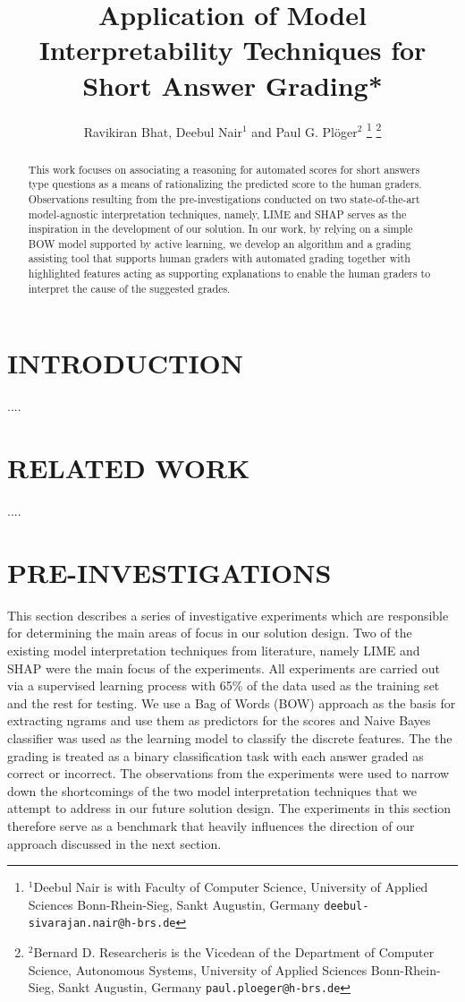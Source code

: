 \documentclass[letterpaper, 10 pt, conference]{ieeeconf}  %
\title{\LARGE \bf
Application of Model Interpretability Techniques for Short Answer Grading*
}
\author{Ravikiran Bhat, Deebul Nair$^{1}$ and Paul G. Pl{\"o}ger$^{2}$%
\thanks{$^{1}$Deebul Nair is with Faculty of Computer Science,
        University of Applied Sciences Bonn-Rhein-Sieg, Sankt Augustin, Germany
        {\tt\small deebul-sivarajan.nair@h-brs.de}}%
\thanks{$^{2}$Bernard D. Researcheris is the Vicedean of the Department of Computer Science, Autonomous Systems, University of Applied Sciences Bonn-Rhein-Sieg, Sankt Augustin, Germany
        {\tt\small paul.ploeger@h-brs.de}}%
}
\begin{document}
\maketitle
\thispagestyle{empty}
\pagestyle{empty}


\begin{abstract}

This work focuses on associating a reasoning for automated scores for short answers type questions as a means of rationalizing the predicted score to the human graders. Observations resulting from the pre-investigations conducted on two state-of-the-art model-agnostic interpretation techniques, namely, LIME and SHAP serves as the inspiration in the development of our solution. In our work, by relying on a simple BOW model supported by active learning, we develop an algorithm and a grading assisting tool that supports human graders with automated grading together with highlighted features acting as supporting explanations to enable the human graders to interpret the cause of the suggested grades. 

\end{abstract}


\section{INTRODUCTION}

....

\section{RELATED WORK}
....

\section{PRE-INVESTIGATIONS}

This section describes a series of investigative experiments which are responsible for determining the main areas of focus in our solution design. Two of the existing model interpretation techniques from literature, namely LIME and SHAP were the main focus of the experiments. All experiments are carried out via a supervised learning process with 65\% of the data used as the training set and the rest for testing. We use a Bag of Words (BOW) approach as the basis for extracting ngrams and use them as predictors for the scores and Naive Bayes classifier was used as the learning model to classify the discrete features. The the grading is treated as a binary classification task with each answer graded as correct or incorrect. The observations from the experiments were used to narrow down the shortcomings of the two model interpretation techniques that we attempt to address in our future solution design. The experiments in this section therefore serve as a benchmark that heavily influences the direction of our approach discussed in the next section.
\end{document}
